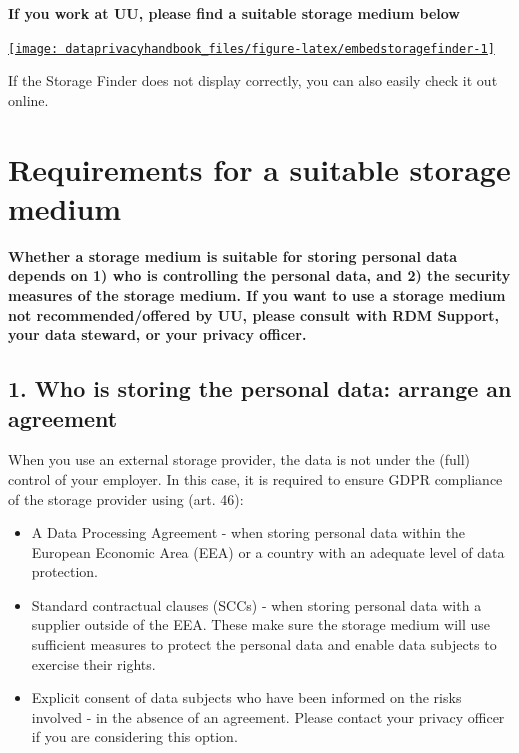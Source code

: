 \documentclass[
]{book}
\providecommand{\tightlist}{%
  \setlength{\itemsep}{0pt}\setlength{\parskip}{0pt}}
\begin{document}
\textbf{If you work at UU, please find a suitable storage medium below}

\begin{center}\href{https://tools.uu.nl/storagefinder/}{\texttt{[image: dataprivacyhandbook\_files/figure-latex/embedstoragefinder-1]} }\end{center}

If the Storage Finder does not display correctly, you can also easily
check it out
online.

\hypertarget{data-storage-requirements}{%
\section{Requirements for a suitable storage medium}\label{data-storage-requirements}}

\textbf{Whether a storage medium is suitable for storing personal data depends on 1) who
is controlling the personal data, and 2) the security measures of the storage
medium. If you want to use a storage medium not recommended/offered by UU,
please consult with
RDM Support,
your data steward, or your
privacy officer.}

\hypertarget{who-is-storing-the-personal-data-arrange-an-agreement}{%
\subsection{1. Who is storing the personal data: arrange an agreement}\label{who-is-storing-the-personal-data-arrange-an-agreement}}

When you use an external storage provider, the data is not under the (full)
control of your employer. In this case, it is required to ensure GDPR compliance
of the storage provider using
(art. 46):

\begin{itemize}
\tightlist
\item
  A Data Processing Agreement -
  when storing personal data within the European Economic Area (EEA) or a
  country with an
  adequate level of data protection.
\item
  Standard
  contractual clauses (SCCs) - when storing personal data with a
  supplier outside of the EEA. These make sure the storage medium will use
  sufficient measures to protect the personal data and enable data subjects to
  exercise their rights.
\item
  Explicit consent of data subjects who have been informed on the risks
  involved - in the absence of an agreement. Please contact your
  privacy officer
  if you are considering this option.
\end{itemize}
\end{document}
